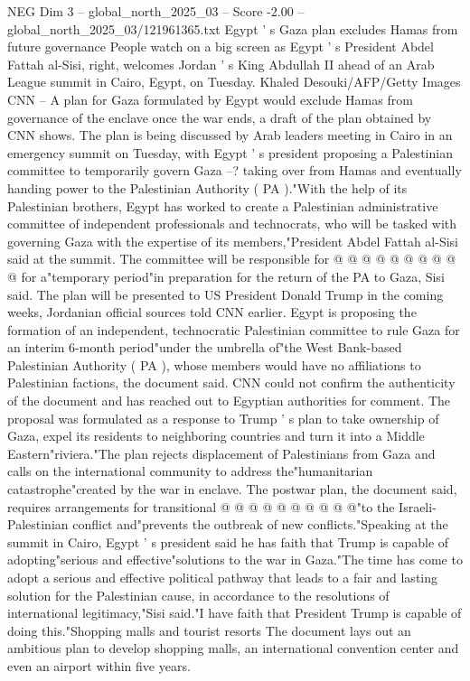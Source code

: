 \begin{textsample}{NEG Dim 3 – global\_north\_2025\_03 – Score -2.00 – global\_north\_2025\_03/121961365.txt}  \label{ex:f3_neg_430}
Egypt ' s Gaza plan excludes Hamas from future governance People watch on a big screen as Egypt ' s President Abdel Fattah al-Sisi, right, welcomes Jordan ' s King Abdullah II ahead of an Arab League summit in Cairo, Egypt, on Tuesday.
Khaled Desouki/AFP/Getty Images CNN -- A plan for Gaza formulated by Egypt would exclude Hamas from governance of the enclave once the war ends, a draft of the plan obtained by CNN shows.
The plan is being discussed by Arab leaders meeting in Cairo in an emergency summit on Tuesday, with Egypt ' s president proposing a Palestinian committee to temporarily govern Gaza --? taking over from Hamas and eventually handing power to the Palestinian Authority ( PA )."With the help of its Palestinian brothers, Egypt has worked to create a Palestinian administrative committee of independent professionals and technocrats, who will be tasked with governing Gaza with the expertise of its members,"President Abdel Fattah al-Sisi said at the summit.
The committee will be responsible for @ @ @ @ @ @ @ @ @ @ for a"temporary period"in preparation for the return of the PA to Gaza, Sisi said.
The plan will be presented to US President Donald Trump in the coming weeks, Jordanian official sources told CNN earlier.
Egypt is proposing the formation of an independent, technocratic Palestinian committee to rule Gaza for an interim 6-month period"under the umbrella of"the West Bank-based Palestinian Authority ( PA ), whose members would have no affiliations to Palestinian factions, the document said.
CNN could not confirm the authenticity of the document and has reached out to Egyptian authorities for comment.
The proposal was formulated as a response to Trump ' s plan to take ownership of Gaza, expel its residents to neighboring countries and turn it into a Middle Eastern"riviera."The plan rejects displacement of Palestinians from Gaza and calls on the international community to address the"humanitarian catastrophe"created by the war in enclave.
The postwar plan, the document said, requires arrangements for transitional @ @ @ @ @ @ @ @ @ @"to the Israeli-Palestinian conflict and"prevents the outbreak of new conflicts."Speaking at the summit in Cairo, Egypt ' s president said he has faith that Trump is capable of adopting"serious and effective"solutions to the war in Gaza."The time has come to adopt a serious and effective political pathway that leads to a fair and lasting solution for the Palestinian cause, in accordance to the resolutions of international legitimacy,"Sisi said."I have faith that President Trump is capable of doing this."Shopping malls and tourist resorts The document lays out an ambitious plan to develop shopping malls, an international convention center and even an airport within five years.

\end{textsample}
